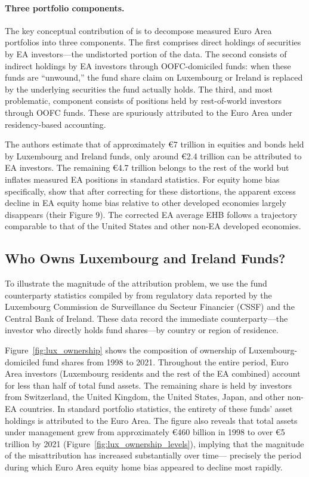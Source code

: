 \documentclass{article}
\begin{document}
\paragraph{Three portfolio components.} The key conceptual contribution 
of \cite{beck2024} is to decompose measured Euro Area portfolios into 
three components. The first comprises direct holdings of securities by 
EA investors---the undistorted portion of the data. The second consists 
of indirect holdings by EA investors through OOFC-domiciled funds: when 
these funds are ``unwound,'' the fund share claim on Luxembourg or Ireland 
is replaced by the underlying securities the fund actually holds. The third, 
and most problematic, component consists of positions held by 
rest-of-world investors through OOFC funds. These are spuriously 
attributed to the Euro Area under residency-based accounting.

The authors estimate that of approximately \euro 7 trillion in equities 
and bonds held by Luxembourg and Ireland funds, only around \euro 2.4 
trillion can be attributed to EA investors. The remaining \euro 4.7 
trillion belongs to the rest of the world but inflates measured EA 
positions in standard statistics. For equity home bias specifically, 
\cite{beck2024} show that after correcting for these distortions, the 
apparent excess decline in EA equity home bias relative to other developed 
economies largely disappears (their Figure 9). The corrected EA average 
EHB follows a trajectory comparable to that of the United States and 
other non-EA developed economies.

\subsection{Who Owns Luxembourg and Ireland Funds?}

To illustrate the magnitude of the attribution problem, we use the fund 
counterparty statistics compiled by \cite{beck2024} from regulatory data 
reported by the Luxembourg Commission de Surveillance du Secteur Financier 
(CSSF) and the Central Bank of Ireland. These data record the immediate 
counterparty---the investor who directly holds fund shares---by country 
or region of residence.

Figure~\ref{fig:lux_ownership} shows the composition of ownership of 
Luxembourg-domiciled fund shares from 1998 to 2021. Throughout the entire 
period, Euro Area investors (Luxembourg residents and the rest of the EA 
combined) account for less than half of total fund assets. The remaining 
share is held by investors from Switzerland, the United Kingdom, the 
United States, Japan, and other non-EA countries. In standard portfolio 
statistics, the entirety of these funds' asset holdings is attributed to 
the Euro Area. The figure also reveals that total assets under management 
grew from approximately \euro 460 billion in 1998 to over \euro 5 trillion 
by 2021 (Figure~\ref{fig:lux_ownership_levels}), implying that the 
magnitude of the misattribution has increased substantially over time---
precisely the period during which Euro Area equity home bias appeared to 
decline most rapidly.
\end{document}
